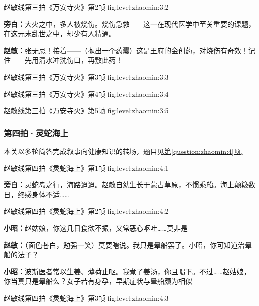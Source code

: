   {赵敏线第三拍《万安寺火》第2帧}
  {fig:level:zhaomin:3:2}
  {\scriptsize}
  {\textbf{旁白：}大火之中，多人被烧伤。烧伤急救——这一在现代医学中至关重要的课题，在这元末乱世之中，却少有人精通。\par
\textbf{赵敏：}张无忌！接着——（抛出一个药囊）这是王府的金创药，对烧伤有奇效！记住——先用清水冲洗伤口，再敷此药！\par}

\clearpage

  {赵敏线第三拍《万安寺火》第3帧}
  {fig:level:zhaomin:3:3}
  {\scriptsize}
  {\mbox{}}

  {赵敏线第三拍《万安寺火》第4帧}
  {fig:level:zhaomin:3:4}
  {\scriptsize}
  {\mbox{}}

  {赵敏线第三拍《万安寺火》第5帧}
  {fig:level:zhaomin:3:5}
  {\scriptsize}
  {\mbox{}}

\clearpage

\subsubsection{第四拍·灵蛇海上}\label{plot:zhaomin:4}
本关以多轮简答完成叙事向健康知识的转场，题目见\hyperref[question:zhaomin:4]{第\ref*{question:zhaomin:4}项}。

  {赵敏线第四拍《灵蛇海上》第1帧}
  {fig:level:zhaomin:4:1}
  {\scriptsize}
  {\textbf{旁白：}灵蛇岛之行，海路迢迢。赵敏自幼生长于蒙古草原，不惯乘船。海上颠簸数日，终感身体不适……\par}

  {赵敏线第四拍《灵蛇海上》第2帧}
  {fig:level:zhaomin:4:2}
  {\scriptsize}
  {\textbf{小昭：}赵姑娘，你这几日食欲不振，又常恶心呕吐……莫非是——\par
\textbf{赵敏：}（面色苍白，勉强一笑）莫要瞎说。我只是晕船罢了。小昭，你可知道治晕船的法子？\par
\textbf{小昭：}波斯医者常以生姜、薄荷止呕。我煮了姜汤，你且喝下。不过……赵姑娘，你当真只是晕船么？女子若有身孕，早期症状与晕船颇为相似——\par}

  {赵敏线第四拍《灵蛇海上》第3帧}
  {fig:level:zhaomin:4:3}
  {\scriptsize}
  {\mbox{}}

